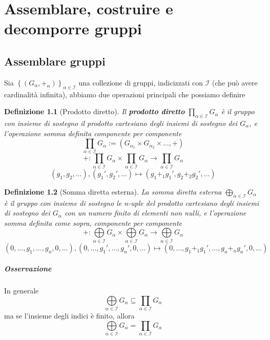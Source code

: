 \documentclass[a4paper]{report}
\newtheorem{definition}{Definizione}
\newcommand{\ra}{\ensuremath{\rightarrow}}
\newcommand{\gdes}{\ensuremath{\underset{\alpha\in\mathcal{I}}{\bigoplus}G_\alpha}}
\newcommand{\gdp}{\ensuremath{\underset{\alpha\in\mathcal{I}}{\prod}G_\alpha}}
\begin{document}
\chapter{Assemblare, costruire e decomporre gruppi}
\section{Assemblare gruppi}
Sia $\left\{(G_\alpha,+_\alpha)\right\}_{\alpha\in\mathcal{I}}$ una collezione di gruppi, indicizzati con $\mathcal{I}$ (che può avere cardinalità infinita), abbiamo due operazioni principali che possiamo definire
\begin{definition}[Prodotto diretto]
    Il \textbf{prodotto diretto} $\prod_{\alpha\in\mathcal{I}}G_\alpha$ è il gruppo con insieme di sostegno il prodotto cartesiano degli insiemi di sostegno dei $G_\alpha$, e l'operazione somma definita componente per componente
    \[
        \underset{\alpha\in\mathcal{I}}{\prod}G_\alpha:=(G_{\alpha_1}\times G_{\alpha_2}\times\dots,+)
    \]
    \[
        +:\underset{\alpha\in\mathcal{I}}{\prod}G_\alpha\times\underset{\alpha\in\mathcal{I}}{\prod}G_\alpha\ra\underset{\alpha\in\mathcal{I}}{\prod}G_\alpha
    \]
    \[
        (g_1,g_2,\dots),(g_1',g_2',\dots)\mapsto(g_1+_1g_1',g_2+_2g_2',\dots)
    \]
\end{definition}
\begin{definition}[Somma diretta esterna]
    La somma diretta esterna $\bigoplus_{\alpha\in\mathcal{I}}G_\alpha$ è il gruppo con insieme di sostegno le n-uple del prodotto cartesiano degli insiemi di sostegno dei $G_\alpha$ con un numero finito di elementi non nulli, e l'operazione somma definita come sopra, componente per componente
    \[
        +:\underset{\alpha\in\mathcal{I}}{\bigoplus}G_\alpha\times\underset{\alpha\in\mathcal{I}}{\bigoplus}G_\alpha\ra\underset{\alpha\in\mathcal{I}}{\bigoplus}G_\alpha
    \]
    \[
        (0,\dots,g_1,\dots,g_n,0,\dots),(0,\dots,g_1',\dots,g_n',0,\dots)\mapsto(0,\dots,g_1+_1g_1',\dots,g_n+_ng_n',0,\dots)
    \]
\end{definition}
\paragraph{Osservazione} In generale
\[
    \gdes\subseteq\gdp
\]
ma se l'insieme degli indici è finito, allora
\[
    \gdes=\gdp
\]
\pagebreak
\end{document}
